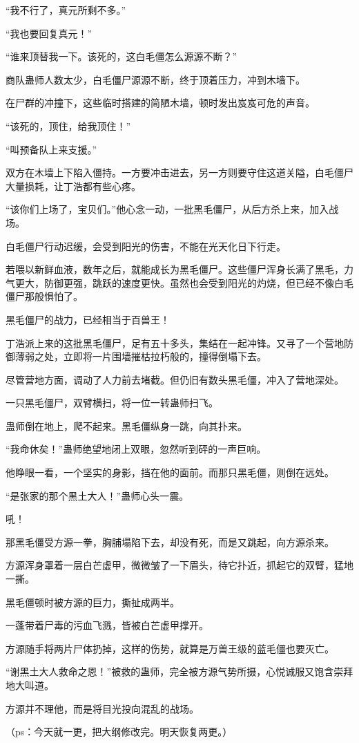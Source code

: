 \begin{this_body}
“我不行了，真元所剩不多。”

“我也要回复真元！”

“谁来顶替我一下。该死的，这白毛僵怎么源源不断？”

商队蛊师人数太少，白毛僵尸源源不断，终于顶着压力，冲到木墙下。

在尸群的冲撞下，这些临时搭建的简陋木墙，顿时发出岌岌可危的声音。

“该死的，顶住，给我顶住！”

“叫预备队上来支援。”

双方在木墙上下陷入僵持。一方要冲击进去，另一方则要守住这道关隘，白毛僵尸大量损耗，让丁浩都有些心疼。

“该你们上场了，宝贝们。”他心念一动，一批黑毛僵尸，从后方杀上来，加入战场。

白毛僵尸行动迟缓，会受到阳光的伤害，不能在光天化日下行走。

若喂以新鲜血液，数年之后，就能成长为黑毛僵尸。这些僵尸浑身长满了黑毛，力气更大，防御更强，跳跃的速度更快。虽然也会受到阳光的灼烧，但已经不像白毛僵尸那般惧怕了。

黑毛僵尸的战力，已经相当于百兽王！

丁浩派上来的这批黑毛僵尸，足有五十多头，集结在一起冲锋。又寻了一个营地防御薄弱之处，立即将一片围墙摧枯拉朽般的，撞得倒塌下去。

尽管营地方面，调动了人力前去堵截。但仍旧有数头黑毛僵，冲入了营地深处。

一只黑毛僵尸，双臂横扫，将一位一转蛊师扫飞。

蛊师倒在地上，爬不起来。黑毛僵纵身一跳，向其扑来。

“我命休矣！”蛊师绝望地闭上双眼，忽然听到砰的一声巨响。

他睁眼一看，一个坚实的身影，挡在他的面前。而那只黑毛僵，则倒在远处。

“是张家的那个黑土大人！”蛊师心头一震。

吼！

那黑毛僵受方源一拳，胸脯塌陷下去，却没有死，而是又跳起，向方源杀来。

方源浑身罩着一层白芒虚甲，微微皱了一下眉头，待它扑近，抓起它的双臂，猛地一撕。

黑毛僵顿时被方源的巨力，撕扯成两半。

一蓬带着尸毒的污血飞溅，皆被白芒虚甲撑开。

方源随手将两片尸体扔掉，这样的伤势，就算是万兽王级的蓝毛僵也要灭亡。

“谢黑土大人救命之恩！”被救的蛊师，完全被方源气势所摄，心悦诚服又饱含崇拜地大叫道。

方源并不理他，而是将目光投向混乱的战场。

（ps：今天就一更，把大纲修改完。明天恢复两更。）

\end{this_body}

